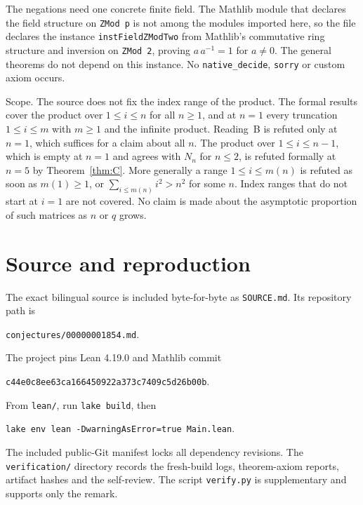 \documentclass[11pt]{article}
\theoremstyle{remark}
\begin{document}
The negations need one concrete finite field. The Mathlib module that
declares the field structure on \texttt{ZMod p} is not among the
modules imported here, so the file declares the instance
\texttt{instFieldZModTwo} from Mathlib's commutative ring structure and
inversion on \texttt{ZMod 2}, proving $a\,a^{-1}=1$ for $a\ne0$. The
general theorems do not depend on this instance. No
\texttt{native\_decide}, \texttt{sorry} or custom axiom occurs.

Scope. The source does not fix the index range of the product. The
formal results cover the product over $1\le i\le n$ for all $n\ge1$,
and at $n=1$ every truncation $1\le i\le m$ with $m\ge1$ and the
infinite product. Reading~B is refuted only at $n=1$, which suffices
for a claim about all $n$. The product over $1\le i\le n-1$, which is
empty at $n=1$ and agrees with $N_n$ for $n\le2$, is refuted formally
at $n=5$ by Theorem~\ref{thm:C}. More generally a range
$1\le i\le m(n)$ is refuted as soon as $m(1)\ge1$, or
$\sum_{i\le m(n)}i^2>n^2$ for some $n$. Index ranges that do not start
at $i=1$ are not covered. No claim is made about the asymptotic
proportion of such matrices as $n$ or $q$ grows.

\section*{Source and reproduction}
The exact bilingual source is included byte-for-byte as
\texttt{SOURCE.md}. Its repository path is
\begin{center}\small\texttt{conjectures/00000001854.md}.\end{center}
The project pins Lean 4.19.0 and Mathlib commit
\begin{center}\small\texttt{c44e0c8ee63ca166450922a373c7409c5d26b00b}.\end{center}
From \texttt{lean/}, run \texttt{lake build}, then
\begin{center}\small\texttt{lake env lean -DwarningAsError=true Main.lean}.\end{center}
The included public-Git manifest locks all dependency revisions.
The \texttt{verification/} directory records the fresh-build logs,
theorem-axiom reports, artifact hashes and the self-review. The script
\texttt{verify.py} is supplementary and supports only the remark.
\end{document}
